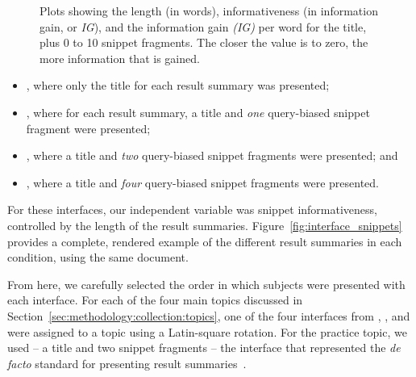 \begin{figure}[t!]
    \centering
    \caption[Information gain plots]{Plots showing the length (in words), informativeness (in information gain, or \emph{IG}), and the information gain \emph{(IG)} per word for the title, plus 0 to 10 snippet fragments. The closer the value is to zero, the more information that is gained.}
    \label{fig:ig_plots}
\end{figure}

\begin{itemize}
    \item{, where only the title for each result summary was presented;}
    \item{, where for each result summary, a title and \emph{one} query-biased snippet fragment were presented;}
    \item{, where a title and \emph{two} query-biased snippet fragments were presented; and}
    \item{, where a title and \emph{four} query-biased snippet fragments were presented.}
\end{itemize}

For these interfaces, our independent variable was snippet informativeness, controlled by the length of the result summaries. Figure~\ref{fig:interface_snippets} provides a complete, rendered example of the different result summaries in each condition, using the same document.

From here, we carefully selected the order in which subjects were presented with each interface. For each of the four main topics discussed in Section~\ref{sec:methodology:collection:topics}, one of the four interfaces from , ,  and  were assigned to a topic using a Latin-square rotation. For the practice topic, we used  -- a title and two snippet fragments -- the interface that represented the \emph{de facto} standard for presenting result summaries~\citep{hearst2009_search}.

